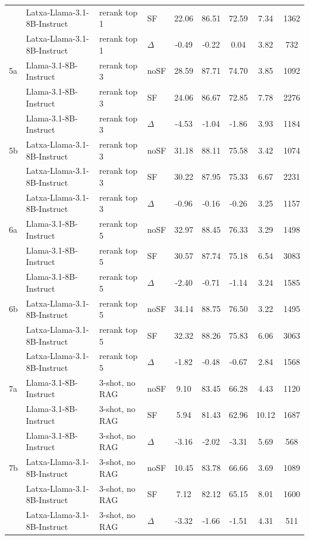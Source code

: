 \begin{scriptsize}
\begin{longtable}{l l l l c c c c c}
 & Latxa-Llama-3.1-8B-Instruct & rerank top 1 & SF & 22.06 & 86.51 & 72.59 & 7.34 & 1362 \\
 & Latxa-Llama-3.1-8B-Instruct & rerank top 1 & $\Delta$ & -0.49 & -0.22 & 0.04 & 3.82 & 732 \\
\dmidrule
5a & Llama-3.1-8B-Instruct & rerank top 3 & noSF & 28.59 & 87.71 & 74.70 & 3.85 & 1092 \\
 & Llama-3.1-8B-Instruct & rerank top 3 & SF & 24.06 & 86.67 & 72.85 & 7.78 & 2276 \\
 & Llama-3.1-8B-Instruct & rerank top 3 & $\Delta$ & -4.53 & -1.04 & -1.86 & 3.93 & 1184 \\
5b & Latxa-Llama-3.1-8B-Instruct & rerank top 3 & noSF & 31.18 & 88.11 & 75.58 & 3.42 & 1074 \\
 & Latxa-Llama-3.1-8B-Instruct & rerank top 3 & SF & 30.22 & 87.95 & 75.33 & 6.67 & 2231 \\
 & Latxa-Llama-3.1-8B-Instruct & rerank top 3 & $\Delta$ & -0.96 & -0.16 & -0.26 & 3.25 & 1157 \\
\dmidrule
\rowcolor{tabhighlight}6a & Llama-3.1-8B-Instruct & rerank top 5 & noSF & 32.97 & 88.45 & 76.33 & 3.29 & 1498 \\
 & Llama-3.1-8B-Instruct & rerank top 5 & SF & 30.57 & 87.74 & 75.18 & 6.54 & 3083 \\
 & Llama-3.1-8B-Instruct & rerank top 5 & $\Delta$ & -2.40 & -0.71 & -1.14 & 3.24 & 1585 \\
6b & Latxa-Llama-3.1-8B-Instruct & rerank top 5 & noSF & 34.14 & 88.75 & 76.50 & 3.22 & 1495 \\
 & Latxa-Llama-3.1-8B-Instruct & rerank top 5 & SF & 32.32 & 88.26 & 75.83 & 6.06 & 3063 \\
 & Latxa-Llama-3.1-8B-Instruct & rerank top 5 & $\Delta$ & -1.82 & -0.48 & -0.67 & 2.84 & 1568 \\
\dmidrule
7a & Llama-3.1-8B-Instruct & 3-shot, no RAG & noSF & 9.10 & 83.45 & 66.28 & 4.43 & 1120 \\
 & Llama-3.1-8B-Instruct & 3-shot, no RAG & SF & 5.94 & 81.43 & 62.96 & 10.12 & 1687 \\
 & Llama-3.1-8B-Instruct & 3-shot, no RAG & $\Delta$ & -3.16 & -2.02 & -3.31 & 5.69 & 568 \\
7b & Latxa-Llama-3.1-8B-Instruct & 3-shot, no RAG & noSF & 10.45 & 83.78 & 66.66 & 3.69 & 1089 \\
 & Latxa-Llama-3.1-8B-Instruct & 3-shot, no RAG & SF & 7.12 & 82.12 & 65.15 & 8.01 & 1600 \\
 & Latxa-Llama-3.1-8B-Instruct & 3-shot, no RAG & $\Delta$ & -3.32 & -1.66 & -1.51 & 4.31 & 511 \\

\end{longtable}
\end{scriptsize}
